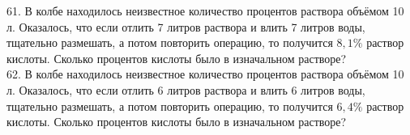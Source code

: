 61.  В колбе находилось неизвестное количество процентов раствора объёмом 10 л. Оказалось, что
если отлить 7 литров раствора и влить 7 литров воды, тщательно размешать, а потом повторить
операцию, то получится $8,1\%$ раствор кислоты. Сколько процентов кислоты было в изначальном растворе?\\
62. В колбе находилось неизвестное количество процентов раствора объёмом 10 л. Оказалось, что
если отлить 6 литров раствора и влить 6 литров воды, тщательно размешать, а потом повторить
операцию, то получится $6,4\%$ раствор кислоты. Сколько процентов кислоты было в изначальном
растворе?
\newpage
